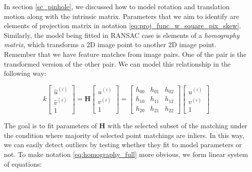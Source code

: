 \documentclass[a4paper]{report}
\numberwithin{figure}{section}
\begin{document}
In section \ref{sc_pinhole}, we discussed how to model rotation and 
translation motion along with the intrinsic matrix. Parameters that we aim to 
identify are elements of projection matrix in notation 
\eqref{eq:proj_func_w_square_pix_skew}.  Similarly, the model being fitted in 
RANSAC case is elements of a \textit{homography matrix}, which transforms a 2D 
image point to another 2D image point.  Remember that we have feature matches 
from image pairs. One of the pair is the transformed version of the other 
pair.  We can model this relationship in the following way:

\begin{equation}\label{eq:homography_full}
  k
  \begin{bmatrix}
    \hat{u}^{(i)} \\ \hat{v}^{(i)} \\1
  \end{bmatrix}
  =
  \mathbf{H}
  \begin{bmatrix}
    u^{(i)} \\ v^{(i)} \\1
  \end{bmatrix}
  =
  \begin{bmatrix}
    h_{00} & h_{01} & h_{02} \\
    h_{10} & h_{11} & h_{12} \\
    h_{20} & h_{21} & h_{22}
    \end{bmatrix}
  \begin{bmatrix}
    u^{(i)} \\ v^{(i)} \\1
    \end{bmatrix}
  \end{equation}

The goal is to fit parameters of $\mathbf{H}$ with the selected subset of the 
matching under the condition where majority of selected point matchings are 
inliers. In this way, we can easily detect outliers by testing whether they 
fit to model parameters or not. To make notation \eqref{eq:homography_full} 
more 
obvious, we form linear system of equations:
\end{document}
